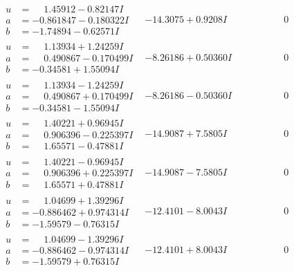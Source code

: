 \documentclass[1p]{elsarticle_modified}
\theoremstyle{definition}
\begin{document}
$$\begin{array}{c|c|c}
\begin{aligned}
u &= \phantom{-}1.45912 - 0.82147 I \\
a &= -0.861847 - 0.180322 I \\
b &= -1.74894 - 0.62571 I\end{aligned}
 & -14.3075 + 0.9208 I & \phantom{-0.000000 } 0 \\ \hline\begin{aligned}
u &= \phantom{-}1.13934 + 1.24259 I \\
a &= \phantom{-}0.490867 - 0.170499 I \\
b &= -0.34581 + 1.55094 I\end{aligned}
 & -8.26186 + 0.50360 I & \phantom{-0.000000 } 0 \\ \hline\begin{aligned}
u &= \phantom{-}1.13934 - 1.24259 I \\
a &= \phantom{-}0.490867 + 0.170499 I \\
b &= -0.34581 - 1.55094 I\end{aligned}
 & -8.26186 - 0.50360 I & \phantom{-0.000000 } 0 \\ \hline\begin{aligned}
u &= \phantom{-}1.40221 + 0.96945 I \\
a &= \phantom{-}0.906396 - 0.225397 I \\
b &= \phantom{-}1.65571 - 0.47881 I\end{aligned}
 & -14.9087 + 7.5805 I & \phantom{-0.000000 } 0 \\ \hline\begin{aligned}
u &= \phantom{-}1.40221 - 0.96945 I \\
a &= \phantom{-}0.906396 + 0.225397 I \\
b &= \phantom{-}1.65571 + 0.47881 I\end{aligned}
 & -14.9087 - 7.5805 I & \phantom{-0.000000 } 0 \\ \hline\begin{aligned}
u &= \phantom{-}1.04699 + 1.39296 I \\
a &= -0.886462 + 0.974314 I \\
b &= -1.59579 - 0.76315 I\end{aligned}
 & -12.4101 - 8.0043 I & \phantom{-0.000000 } 0 \\ \hline\begin{aligned}
u &= \phantom{-}1.04699 - 1.39296 I \\
a &= -0.886462 - 0.974314 I \\
b &= -1.59579 + 0.76315 I\end{aligned}
 & -12.4101 + 8.0043 I & \phantom{-0.000000 } 0\\

\end{array}$$
\end{document}
